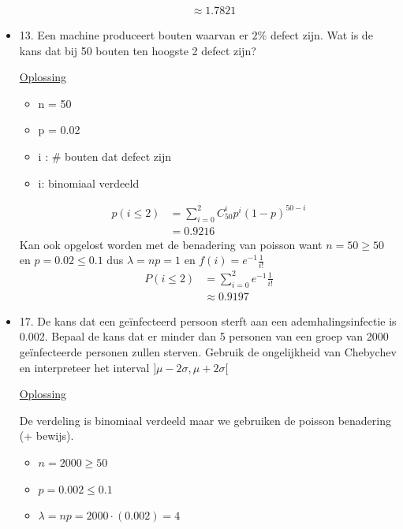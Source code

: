 \documentclass[12pt]{report}
\newcommand{\exercise}[2]{
  #1
  

  \underline{Oplossing}
  
  #2
  
    \hrulefill
}
\begin{document}
\begin{itemize}[label={}]
{{\begin{enumerate}
\begin{equation*}
\begin{split}
              & \approx 1.7821
             \end{split}
            \end{equation*}
        \end{enumerate}
    }
 }
 \item {
    \exercise{
        13. Een machine produceert bouten waarvan er $2\%$ defect zijn. Wat is de kans dat bij 50 bouten ten hoogste 2 defect zijn?
    }{
        \begin{itemize}
            \item n = 50
            \item p = 0.02
            \item i : \# bouten dat defect zijn
            \item i: binomiaal verdeeld
        \end{itemize}
        \begin{equation*}
         \begin{split}
          p(i \leq 2) & = \sum_{i = 0}^{2} C_{50}^ip^i(1 - p)^{50 - i} \\
                      & = 0.9216
         \end{split}
        \end{equation*}
        Kan ook opgelost worden met de benadering van poisson want $n = 50 \geq 50$ en $p = 0.02 \leq 0.1$ dus $\lambda = np = 1$ en $f(i) = e^{-1}\frac{1}{i!}$
        \begin{equation*}
         \begin{split}
          P(i \leq 2 ) & = \sum_{i = 0}^{2}e^{-1}\frac{1}{i!} \\
                       & \approx 0.9197
         \end{split}
        \end{equation*}
    }
 }
 \item {
    \exercise{ 
        17. De kans dat een geïnfecteerd persoon sterft aan een ademhalingsinfectie is 0.002. Bepaal de kans dat er minder dan 5 personen van een groep van 2000 geïnfecteerde personen zullen sterven. Gebruik de ongelijkheid van Chebychev en interpreteer het interval $]\mu - 2\sigma, \mu + 2\sigma[$
    }{
        De verdeling is binomiaal verdeeld maar we gebruiken de poisson benadering (+ bewijs).
        \begin{itemize}
            \item {$n = 2000 \geq 50$}
            \item {$p = 0.002 \leq 0.1$}
            \item {$\lambda = np = 2000\cdot(0.002) = 4$}

\end{itemize}}}
\end{itemize}
\end{document}
